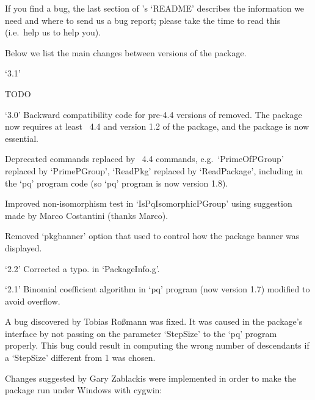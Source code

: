 If you find a bug, the last section of {\ANUPQ}'s `README' describes  the
information we need and where to send us a bug report;  please  take  the
time to read this (i.e.~help us to help you).


Below we list the main changes between versions of the {\ANUPQ} package.

\beginlist


\item{`3.1'}
\item{}
TODO

  
\item{`3.0'}
Backward compatibility code for pre-4.4 versions of {\GAP}  removed.  The
{\ANUPQ} package now requires at least {\GAP}~4.4 and version 1.2 of  the
{\AutPGrp} package, and the {\AutPGrp} package is now essential.

\item{}
Deprecated commands replaced by {\GAP}~4.4 commands, e.g.~`PrimeOfPGroup'
replaced by `PrimePGroup', `ReadPkg' replaced by `ReadPackage', including
in the `pq' program code (so `pq' program is now version 1.8).

\item{}
Improved non-isomorphism test in `IsPqIsomorphicPGroup' using  suggestion
made by Marco Costantini (thanks Marco).

\item{}
Removed `pkgbanner' option that used to control how the {\ANUPQ}  package
banner was displayed.

\item{`2.2'}
Corrected a typo. in `PackageInfo.g'.

\item{`2.1'}
Binomial coefficient algorithm in `pq' program (now version 1.7) modified
to avoid overflow.

\item{}
A bug discovered by Tobias Ro{\ss}mann was fixed. It was  caused  in  the
{\ANUPQ} package's interface by not passing on the  parameter  `StepSize'
to the `pq' program properly. This bug  could  result  in  computing  the
wrong number of descendants if a `StepSize' different from 1 was chosen.

\item{}
Changes suggested by Gary Zablackis were implemented in order to make the
package run under Windows with cygwin:

